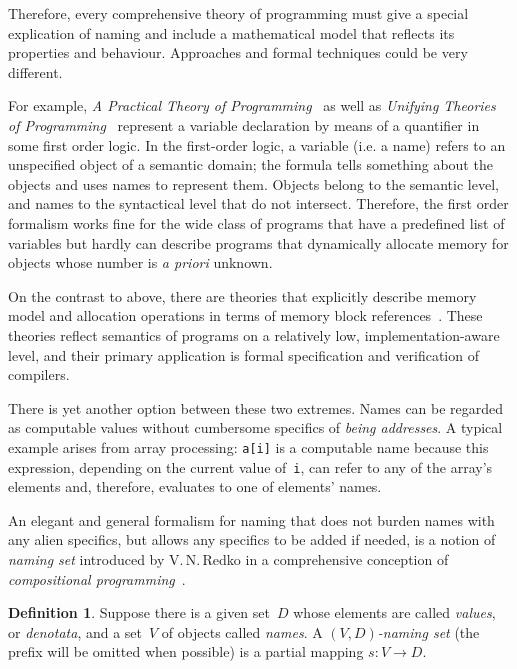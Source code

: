 \documentclass{article}
\theoremstyle{definition}
\newtheorem{Df}{Definition}
\begin{document}
Therefore, every comprehensive theory of programming must give a special
explication of naming and include a mathematical model that reflects its
properties and behaviour.  Approaches and formal techniques could be very
different.

For example, \emph{A Practical Theory of Programming}~\cite{bib:ptop} as well as
\emph{Unifying Theories of Programming}~\cite{bib:utp} represent a variable
declaration by means of a quantifier in some first order logic.  In the
first-order logic, a variable (i.e. a name) refers to an unspecified object of a
semantic domain; the formula tells something about the objects and uses names to
represent them.  Objects belong to the semantic level, and names to the
syntactical level that do not intersect.  Therefore, the first order formalism
works fine for the wide class of programs that have a predefined list of
variables but hardly can describe programs that dynamically allocate memory for
objects whose number is \emph{a priori} unknown.

On the contrast to above, there are theories that explicitly describe memory
model and allocation operations in terms of memory block
references~\cite{bib:leroy}.  These theories reflect semantics of programs on a
relatively low, implementation-aware level, and their primary application is
formal specification and verification of compilers.

There is yet another option between these two extremes.  Names can be regarded
as computable values without cumbersome specifics of \emph{being addresses}.  A
typical example arises from array processing: \lstinline{a[i]} is a computable
name because this expression, depending on the current value of~\lstinline{i},
can refer to any of the array's elements and, therefore, evaluates to one of
elements' names.

An elegant and general formalism for naming that does not burden names
with any alien specifics, but allows any specifics to be added if needed,
is a notion of \emph{naming set} introduced by V.\,N.\,Redko in a
comprehensive conception of \emph{compositional programming}~\cite{bib:redko}.

\begin{Df}\label{df:naming-set}
Suppose there is a given set~$D$ whose elements are called \emph{values}, or
\emph{denotata}, and a set~$V$ of objects called \emph{names}.
A \emph{$(V,D)$-naming set} (the prefix will be omitted when possible) is a
partial mapping $s: V\to D$.
\end{Df}
\end{document}
